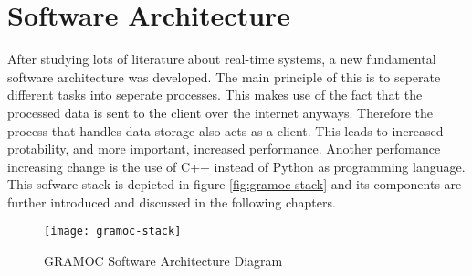 \chapter{Software Architecture}
\label{ch:Software_Architecture}

\author{Nico Kratky}
%

After studying lots of literature about real-time systems, a new fundamental software architecture was developed. The main principle of this is to seperate different tasks into seperate processes. This makes use of the fact that the processed data is sent to the client over the internet anyways. Therefore the process that handles data storage also acts as a client. This leads to increased protability, and more important, increased performance. Another perfomance increasing change is the use of C++ instead of Python as programming language. This sofware stack is depicted in figure \vref{fig:gramoc-stack} and its components are further introduced and discussed in the following chapters.

\begin{figure}[!htb]
    \centering
    \texttt{[image: gramoc-stack]}
    \caption{GRAMOC Software Architecture Diagram}
    \label{fig:gramoc-stack}
\end{figure}

